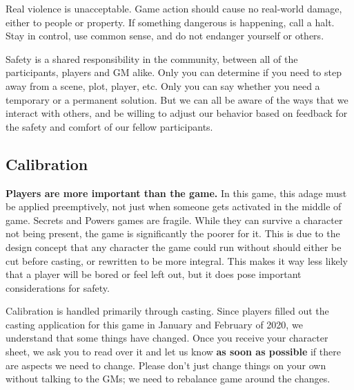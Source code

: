 \documentclass[sheet]{GL2020}
\begin{document}
Real violence is unacceptable. Game action should cause no real-world damage, either to people or property. If something dangerous is happening, call a halt. Stay in control, use common sense, and do not endanger yourself or others.

Safety is a shared responsibility in the community, between all of the participants, players and GM alike. Only you can determine if you need to step away from a scene, plot, player, etc. Only you can say whether you need a temporary or a permanent solution. But we can all be aware of the ways that we interact with others, and be willing to adjust our behavior based on feedback for the safety and comfort of our fellow participants.

\subsection{Calibration}
\textbf{Players are more important than the game.} In this game, this adage must be applied preemptively, not just when someone gets activated in the middle of game. Secrets and Powers games are fragile. While they can survive a character not being present, the game is significantly the poorer for it. This is due to the design concept that any character the game could run without should either be cut before casting, or rewritten to be more integral. This makes it way less likely that a player will be bored or feel left out, but it does pose important considerations for safety.

Calibration is handled primarily through casting. Since players filled out the casting application for this game in January and February of 2020, we understand that some things have changed. Once you receive your character sheet, we ask you to read over it and let us know \textbf{as soon as possible} if there are aspects we need to change. Please don’t just change things on your own without talking to the GMs; we need to rebalance game around the changes.
\end{document}
